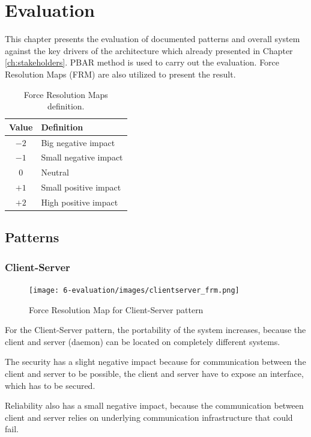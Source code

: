 
\clearpage
\chapter{Evaluation}
\label{ch:evaluation}
This chapter presents the evaluation of documented patterns and overall system
against the key drivers of the architecture which already presented in Chapter
\ref{ch:stakeholders}. PBAR\cite{pbar} method is used to carry out the
evaluation. Force Resolution Maps (FRM) are also utilized to present the result.

\begin{table}[H]
\centering
\caption{Force Resolution Maps definition.}
\label{tab:frm-table}
\begin{tabular}{cl}
\textbf{Value} & \textbf{Definition} \\ \toprule
            $-2$   & Big negative impact \\
            $-1$   & Small negative impact \\
            $0$    & Neutral \\
            $+1$   & Small positive impact \\
            $+2$   & High positive impact 
\end{tabular}
\end{table}

\section{Patterns}

\subsection{Client-Server}
\begin{figure}[H]
\centering
\texttt{[image: 6-evaluation/images/clientserver\_frm.png]}
\caption{Force Resolution Map for Client-Server pattern}
\label{fig:clientserver-frm}
\end{figure}
For the Client-Server pattern, the portability of the system increases, because the client and server (daemon) can be located on completely different systems.

The security has a slight negative impact because for communication between the client and server to be possible, the client and server have to expose an interface, which has to be secured. 

Reliability also has a small negative impact, because the communication between client and server relies on underlying communication infrastructure that could fail. 

